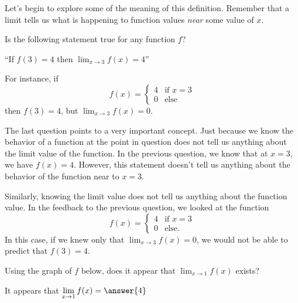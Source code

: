 \documentclass{ximera}
\begin{document}
Let's begin to explore some of the meaning of this definition.  Remember 
that a limit tells us what is happening to function values {\em near} some value of $x$.

\begin{question}
Is the following statement true for any function $f$?

``If $f(3) = 4$ then $\displaystyle \lim_{x \to 3} f(x) = 4$''

\begin{multipleChoice}
\end{multipleChoice}

\begin{feedback}
  For instance, if
  \[
  f(x) =
  \begin{cases}
    4 &\text{if $x=3$} \\
    0 &\text{else}
  \end{cases}
  \]
  then $f(3)=4$, but $\lim_{x \to 3} f(x) =0$.
\end{feedback}
\end{question}

The last question points to a very important concept.  Just because we know the 
behavior of a function at the point in question does not tell us anything about the 
limit value of the function.  In the previous question, we know that at $x = 3$, we 
have $f(x) = 4$.  However, this statement doesn't tell us anything about the behavior 
of the function near to $x = 3$.

Similarly, knowing the limit value does not tell us anything about the function value. 
In the feedback to the previous question, we looked at the function 
  \[
  f(x) =
  \begin{cases}
    4 &\text{if $x=3$} \\
    0 &\text{else}.
  \end{cases}
  \]
In this case, if we knew only that $\lim_{x \to 3} f(x) = 0$, we would not be able 
to predict that $f(3) = 4$.

\begin{question}
Using the graph of $f$ below, does it appear that $\lim_{x \to 1} f(x)$ exists?  


\begin{multipleChoice}
\end{multipleChoice}


\begin{feedback}
	It appears that $\lim_{x\to 1} f(x) =  \answer{4}$ 
\end{feedback}


\end{question}
\end{document}

